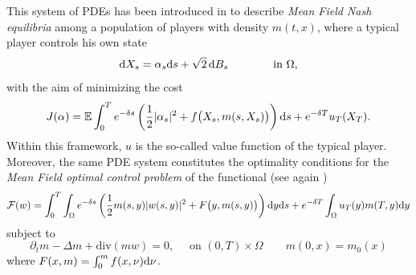 \documentclass[10pt,a4paper,nouppercase,nowrite]{article}
\numberwithin{equation}{section}
\newcommand{\di}{{\rm d}}
\theoremstyle{definition}
\begin{document}
	This system of PDEs has been introduced in \cite{LLcras} to describe \textit{Mean Field Nash equilibria} among a population of players with density $m(t,x)$, where a typical player controls his own state
	\[
\di X_s = \alpha_s \di s + \sqrt{2} \, \di B_s \qquad\qquad \text{in }\Omega,
\]
with the aim of minimizing the cost
\[
J(\alpha) =  \mathbb{E} \int_{0}^T e^{-\delta s}\left(\frac12|\alpha_s|^2 + f\big(X_s, m(s,X_s) \big) \right) \di s + e^{-\delta T}u_T(X_T).
\]
	Within this framework, $u$ is the so-called value function of the typical player. Moreover, the same PDE system constitutes the optimality conditions for the \textit{Mean Field optimal control problem} of the functional (see again \cite{LLcras})
	\[
	\mathcal F(w) = \int_0^T \int_{\Omega} e^{-\delta s}\left(\frac{1}2m(s,y) |w(s,y)|^2 + F\big(y, m(s,y) \big) \right) \di y \di s + e^{-\delta T}\int_{\Omega} u_T(y) m(T,y)\di y
	\]
	subject to
	\[
	\partial_t m - \Delta m + \text{div}(m w)=0,\quad  \text{ on } (0,T) \times \Omega \qquad m(0,x)=m_0(x)
	\]
	where $F(x,m) = \int_0^m f(x,\nu)\di \nu$.
	
	\medskip
	
\end{document}
